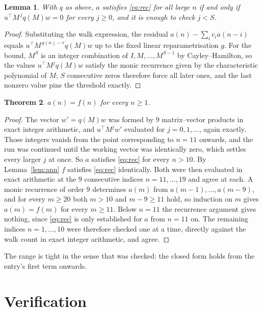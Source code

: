 \documentclass[11pt,a4paper]{article}
\theoremstyle{plain}
\newtheorem{theorem}{Theorem}
\newtheorem{lemma}[theorem]{Lemma}
\theoremstyle{definition}
\begin{document}
\begin{lemma}\label{lem:crit}
With $q$ as above, $a$ satisfies \eqref{eq:rec} for all large $n$ if and only if
$u^{\!\top}M^{\,j}q(M)w=0$ for every $j\ge0$, and it is enough to check $j<S$.
\end{lemma}

\begin{proof}
Substituting the walk expression, the residual $a(n)-\sum_ic_ia(n-i)$ equals
$u^{\!\top}M^{\,g(n)-r}q(M)w$ up to the fixed linear reparametrisation $g$. For the bound,
$M^{S}$ is an integer combination of $I,M,\dots,M^{S-1}$ by Cayley--Hamilton, so the values
$u^{\!\top}M^{j}q(M)w$ satisfy the monic recurrence given by the characteristic polynomial of
$M$; $S$ consecutive zeros therefore force all later ones, and the last nonzero value pins the
threshold exactly.
\end{proof}

\begin{theorem}
$a(n)=f(n)$ for every $n\ge1$.
\end{theorem}

\begin{proof}
The vector $w'=q(M)w$ was formed by $9$ matrix--vector products in exact integer
arithmetic, and $u^{\!\top}M^{j}w'$ evaluated for $j=0,1,\dots$, again exactly. Those integers
vanish from the point corresponding to $n=11$ onwards, and the run was continued until the
working vector was identically zero, which settles every larger $j$ at once. So $a$ satisfies
\eqref{eq:rec} for every $n>10$. By Lemma~\ref{lem:ann} $f$ satisfies \eqref{eq:rec}
identically. Both were then evaluated in exact arithmetic at the $9$ consecutive indices
$n=11,\dots,19$ and agree at each. A monic recurrence of order $9$
determines $a(m)$ from $a(m-1),\dots,a(m-9)$, and for every $m\ge20$ both
$m>10$ and $m-9\ge11$ hold, so induction on $m$ gives $a(m)=f(m)$ for every
$m\ge11$.
Below $n=11$ the recurrence argument gives nothing, since \eqref{eq:rec} is only
established for $a$ from $n=11$ on. The remaining indices $n=1,\dots,10$ were
therefore checked one at a time, directly against the walk count in exact integer arithmetic,
and agree.
\end{proof}

The range is tight in the sense that was checked: the closed form holds from the entry's first term onwards.

\section{Verification}
\end{document}
